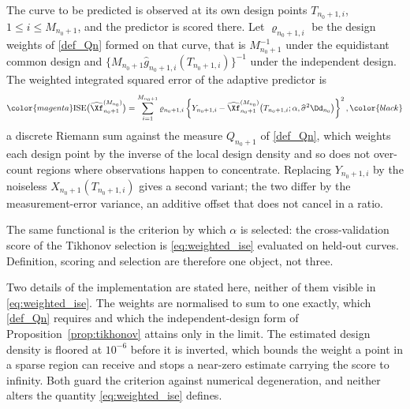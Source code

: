 \color{magenta}
The curve to be predicted is observed at its own design points $T_{n_0+1,i}$, $1\leq i \leq M_{n_0+1}$, and the predictor is scored there. Let $\varrho_{n_0+1,i}$ be the design weights of \eqref{def_Qn} formed on that curve, that is $M_{n_0+1}^{-1}$ under the equidistant common design and $\{M_{n_0+1}\widehat g_{n_0+1,i}(T_{n_0+1,i})\}^{-1}$ under the independent design. The weighted integrated squared error of the adaptive predictor is
\color{black}
\begin{equation}\label{eq:weighted_ise}
	\color{magenta}\mathrm{ISE}\big(\widehat{\Xf}^{(M_{n_0})}_{n_0+1}\big) = \sum_{i=1}^{M_{n_0+1}} \varrho_{n_0+1,i}\left\{Y_{n_0+1,i} - \widehat{\Xf}^{(M_{n_0})}_{n_0+1}\big(T_{n_0+1,i};\alpha,\widehat\sigma^2 \Dd_{n_0}\big)\right\}^2,\color{black}
\end{equation}
\color{magenta}
a discrete Riemann sum against the measure $Q_{n_0+1}$ of \eqref{def_Qn}, which weights each design point by the inverse of the local design density and so does not over-count regions where observations happen to concentrate. Replacing $Y_{n_0+1,i}$ by the noiseless $X_{n_0+1}(T_{n_0+1,i})$ gives a second variant; the two differ by the measurement-error variance, an additive offset that does not cancel in a ratio.

The same functional is the criterion by which $\alpha$ is selected: the cross-validation score of the Tikhonov selection is \eqref{eq:weighted_ise} evaluated on held-out curves. Definition, scoring and selection are therefore one object, not three.

Two details of the implementation are stated here, neither of them visible in \eqref{eq:weighted_ise}. The weights are normalised to sum to one exactly, which \eqref{def_Qn} requires and which the independent-design form of Proposition~\ref{prop:tikhonov} attains only in the limit. The estimated design density is floored at $10^{-6}$ before it is inverted, which bounds the weight a point in a sparse region can receive and stops a near-zero estimate carrying the score to infinity. Both guard the criterion against numerical degeneration, and neither alters the quantity \eqref{eq:weighted_ise} defines.

